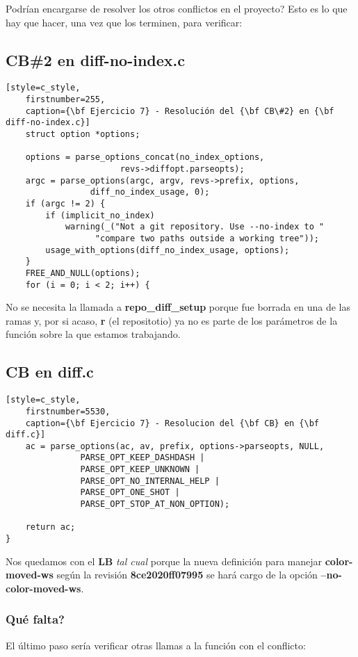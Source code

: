 Podrían encargarse de resolver los otros conflictos en el proyecto? Esto es lo que hay que hacer, una vez que los terminen, para verificar:

\subsection*{CB\#2 en diff-no-index.c}
\begin{lstlisting}[style=c_style,
	firstnumber=255,
	caption={\bf Ejercicio 7} - Resolución del {\bf CB\#2} en {\bf diff-no-index.c}]
	struct option *options;

	options = parse_options_concat(no_index_options,
				       revs->diffopt.parseopts);
	argc = parse_options(argc, argv, revs->prefix, options,
			     diff_no_index_usage, 0);
	if (argc != 2) {
		if (implicit_no_index)
			warning(_("Not a git repository. Use --no-index to "
				  "compare two paths outside a working tree"));
		usage_with_options(diff_no_index_usage, options);
	}
	FREE_AND_NULL(options);
	for (i = 0; i < 2; i++) {
\end{lstlisting}

No se necesita la llamada a {\bf repo\_diff\_setup} porque fue borrada en una de las ramas y, por si acaso, {\bf r} (el repositotio)
ya no es parte de los parámetros de la función sobre la que estamos trabajando.

\subsection*{CB en diff.c}

\begin{lstlisting}[style=c_style,
	firstnumber=5530,
	caption={\bf Ejercicio 7} - Resolucion del {\bf CB} en {\bf diff.c}]
	ac = parse_options(ac, av, prefix, options->parseopts, NULL,
			   PARSE_OPT_KEEP_DASHDASH |
			   PARSE_OPT_KEEP_UNKNOWN |
			   PARSE_OPT_NO_INTERNAL_HELP |
			   PARSE_OPT_ONE_SHOT |
			   PARSE_OPT_STOP_AT_NON_OPTION);

	return ac;
}
\end{lstlisting}

Nos quedamos con el {\bf LB} {\it tal cual} porque la nueva definición para manejar {\bf color-moved-ws} según la revisión {\bf 8ce2020ff07995}
se hará cargo de la opción {\bf --no-color-moved-ws}.

\subsubsection{Qué falta?}
El último paso sería verificar otras llamas a la función con el conflicto:

